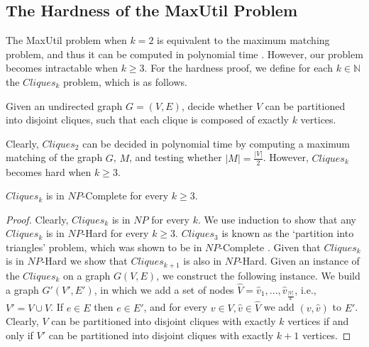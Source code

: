 \documentclass[sigconf,anonymous]{aamas}
\begin{document}
\subsection{The Hardness of the MaxUtil Problem}
The MaxUtil problem when $k=2$ is equivalent to the maximum matching problem, and thus it can be computed in polynomial time \cite{edmons1965paths}.
However, our problem becomes intractable when $k \geq 3$. 
For the hardness proof, we define for each $k \in \mathbb{N}$ the $Cliques_k$ problem, which is as follows.
\begin{definition}[$Cliques_k$]
Given an undirected graph $G=(V,E)$, decide whether $V$ can be partitioned into disjoint cliques, such that each clique is composed of exactly $k$ vertices.
\end{definition}
Clearly, $Cliques_2$ can be decided in polynomial time by computing a maximum matching of the graph $G$, $M$, and testing whether $|M| = \frac{|V|}{2}$.
However, $Cliques_k$ becomes hard when $k\geq 3$.
\begin{lemma}
$Cliques_k$ is in $NP$-Complete for every $k\geq3$.
\end{lemma}
\begin{proof}
Clearly, $Cliques_k$ is in $NP$ for every $k$.
We use induction to show that any $Cliques_k$ is in $NP$-Hard for every $k\geq 3$.
$Cliques_3$ is known as the `partition into triangles' problem, which was shown to be in $NP$-Complete \cite{garey1979computers}.
Given that $Cliques_k$ is in $NP$-Hard we show that $Cliques_{k+1}$ is also in $NP$-Hard.
Given an instance of the $Cliques_k$ on a graph $G(V,E)$, we construct the following instance. We build a graph $G'(V',E')$, in which we add a set of nodes $\hat{V} = {\hat{v}_1, ..., \hat{v}_{\frac{|V|}{k}}}$, i.e., $V' = V \cup \hat{V}$. If $e \in E$ then $e \in E'$, and for every $v \in V, \hat{v} \in \hat{V}$ we add $(v,\hat{v})$ to $E'$.
Clearly, $V$ can be partitioned into disjoint cliques with exactly $k$ vertices if and only if $V'$ can be partitioned into disjoint cliques with  exactly $k+1$ vertices.
\end{proof}
\end{document}
